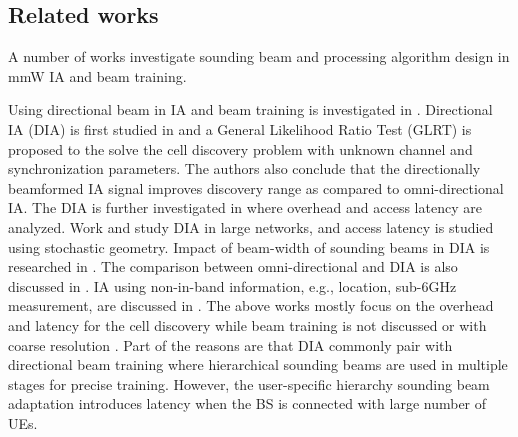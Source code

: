 \documentclass[journal]{IEEEtran}
\begin{document}


 

\subsection{Related works}

A number of works investigate sounding beam and processing algorithm design in mmW IA and beam training.

Using directional beam in IA and beam training is investigated in \cite{7161389,Caire_DIA_arxiv_1709,UTA_stocha_geo_IA_TCOM_18,KTH_stoch_geo_IA_arxiv_1802,Meng_OIA_TCOM_1803,Zorzi_IA_MCOM_1611,UTA_IA_TWC_1705,Giordani_beam_turotial_arxiv_1804,6847111,7914759}. Directional IA (DIA) is first studied in \cite{7161389} and a General Likelihood Ratio Test (GLRT) is proposed to the solve the cell discovery problem with unknown channel and synchronization parameters. The authors also conclude that the directionally beamformed IA signal improves discovery range as compared to omni-directional IA. The DIA is further investigated in \cite{Caire_DIA_arxiv_1709} where overhead and access latency are analyzed. Work \cite{UTA_stocha_geo_IA_TCOM_18} and \cite{KTH_stoch_geo_IA_arxiv_1802} study DIA in large networks, and access latency is studied using stochastic geometry. Impact of beam-width of sounding beams in DIA is researched in \cite{UTA_IA_TWC_1705}. The comparison between omni-directional and DIA is also discussed in \cite{Meng_OIA_TCOM_1803}. IA using non-in-band information, e.g., location, sub-6GHz measurement, are discussed in \cite{Zorzi_IA_MCOM_1611,Giordani_beam_turotial_arxiv_1804}. The above works mostly focus on the overhead and latency for the cell discovery while beam training is not discussed or with coarse resolution \cite{Caire_DIA_arxiv_1709}. Part of the reasons are that DIA commonly pair with directional beam training \cite{6847111,7914759} where hierarchical sounding beams are used in multiple stages for precise training. However, the user-specific hierarchy sounding beam adaptation introduces latency when the BS is connected with large number of UEs.
\end{document}
